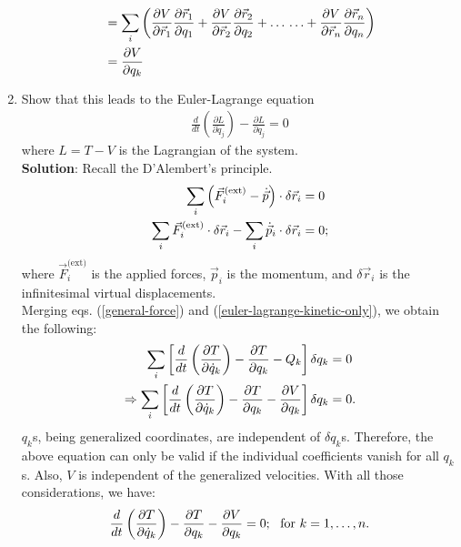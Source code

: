 \begin{enumerate}
\begin{align}
        &=\sum_i\left(\frac{\partial V}{\partial\vec{r}_1}\frac{\partial\vec{r}_1}{\partial q_1}+\frac{\partial V}{\partial\vec{r}_2}\frac{\partial\vec{r}_2}{\partial q_2}+\ldots\,\ldots+\frac{\partial V}{\partial\vec{r}_n}\frac{\partial\vec{r}_n}{\partial q_n}\right)\notag\\
        &=\frac{\partial V}{\partial q_k}
    \end{align}\bigskip
    \hline\hline\bigskip
    \item Show that this leads to the Euler-Lagrange equation
    \begin{align*}
        \frac{d}{dt} \left( \frac{\partial L}{\partial \dot{q}_j} \right) - \frac{\partial L}{\partial q_j} = 0
    \end{align*}
    where $L = T - V$ is the Lagrangian of the system.\\\bigskip
    \hline\hline\bigskip
    \textbf{Solution}: Recall the D'Alembert's principle.
    \begin{align}
        \sum_i\left(\vec{F}_i^\text{(ext)}-\dot{\vec{p}}\right)\cdot\delta\vec{r}_i&=0\notag\\
        \sum_i\vec{F}_i^\text{(ext)}\cdot\delta\vec{r}_i-\sum_i \dot{\vec{p}}_i\cdot\delta\vec{r}_i&=0;
    \end{align}
    where $\vec{F}_i^\text{(ext)}$ is the applied forces, $\vec{p}_i$ is the momentum, and $\delta\vec{r}_i$ is the infinitesimal virtual displacements.\\
    Merging eqs. (\ref{general-force}) and (\ref{euler-lagrange-kinetic-only}), we obtain the following:
    \begin{align}
        \sum_i\left[\frac{d}{dt}\left(\frac{\partial T}{\partial\dot{q}_k}\right)-\frac{\partial T}{\partial{q}_k}-Q_k\right]\delta q_k&=0\notag\\
        \Rightarrow\sum_i\left[\frac{d}{dt}\left(\frac{\partial T}{\partial\dot{q}_k}\right)-\frac{\partial T}{\partial{q}_k}-\frac{\partial V}{\partial q_k}\right]\delta q_k&=0.
    \end{align}
    $q_k$s, being generalized coordinates, are independent of $\delta q_k$s. Therefore, the above equation can only be valid if the individual coefficients vanish for all $q_k$s. Also, $V$ is independent of the generalized velocities. With all those considerations, we have:
    \begin{align}
        \frac{d}{dt}\left(\frac{\partial T}{\partial\dot{q}_k}\right)-\frac{\partial T}{\partial{q}_k}-\frac{\partial V}{\partial q_k}&=0;~~\text{for }k=1,\ldots,n.\notag\\

\end{align}
\end{enumerate}
